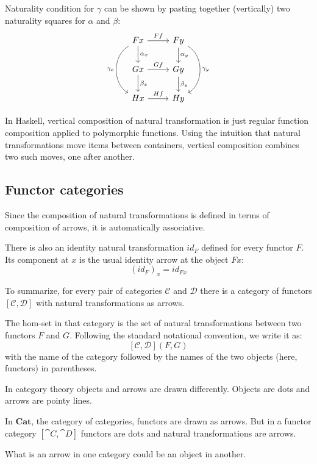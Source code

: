 \documentclass[DaoFP]{subfiles}
\begin{document}
Naturality condition for $\gamma$ can be shown by pasting together (vertically) two naturality squares for $\alpha$ and $\beta$:
\[
 \begin{tikzcd}
 F x
 \arrow[d, "\alpha_x"]
 \arrow[r, "F f"]
 \arrow[dd, bend right = 60, "\gamma_x"']
 &
F y
  \arrow[d, "\alpha_y"]
 \arrow[dd, bend left = 60, "\gamma_y"]
 \\
G x
 \arrow[r, "G f"]
 \arrow[d, "\beta_x"]
& G y
\arrow[d, "\beta_y"]
\\
H x
\arrow[r, "H f"]
& H y
 \end{tikzcd}
\]

In Haskell, vertical composition of natural transformation is just regular function composition applied to polymorphic functions. Using the intuition that natural transformations move items between containers, vertical composition combines two such moves, one after another.

\subsection{Functor categories}

Since the composition of natural transformations is defined in terms of composition of arrows, it is automatically associative. 

There is also an identity natural transformation $id_F$ defined for every functor $F$. Its component at $x$ is the usual identity arrow at the object $F x$:
\[ (id_F)_x = id_{F x} \]

To summarize, for every pair of categories $\mathcal{C}$ and $\mathcal{D}$ there is a category of functors $[\mathcal{C}, \mathcal{D}]$ with natural transformations as arrows. 

The hom-set in that category is the set of natural transformations between two functors $F$ and $G$. Following the standard notational convention, we write it as:
\[ [\mathcal{C}, \mathcal{D}](F, G) \]
with the name of the category followed by the names of the two objects (here, functors) in parentheses.

In category theory objects and arrows are drawn differently. Objects are dots and arrows are pointy lines.

In $\mathbf{Cat}$, the category of categories, functors are drawn as arrows. But in a functor category $[\cat C, \cat D]$ functors are dots and natural transformations are arrows.

What is an arrow in one category could be an object in another.
\end{document}
